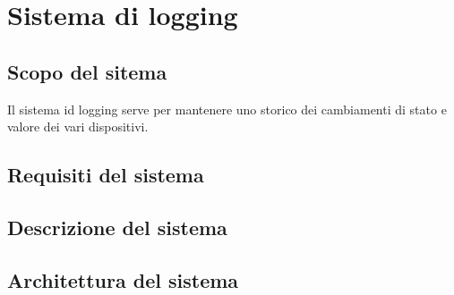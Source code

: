 \chapter{Sistema di logging}\label{cap:microservizio-logging}

\section{Scopo del sitema}

Il sistema id logging serve per mantenere uno storico dei cambiamenti di stato e valore dei vari dispositivi.


\section{Requisiti del sistema}
\section{Descrizione del sistema}
\section{Architettura del sistema}
